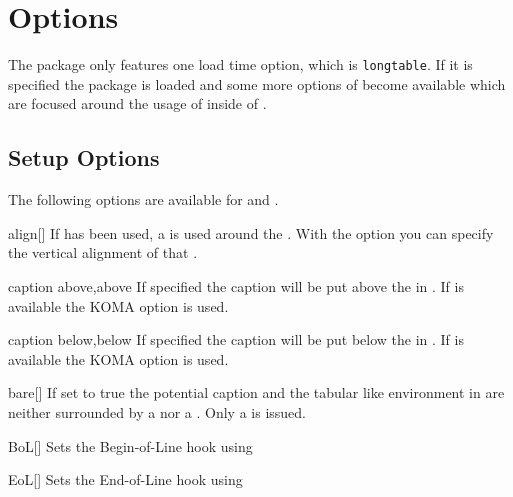 \section{Options}\label{sec:tab:options}%
The package only features one load time option, which is \texttt{longtable}. If
it is specified the  package is loaded and some more options of
 become available which are focused around the usage of
 inside of .

\subsection{Setup Options}\label{sec:tab:options:setup}
The following options are available for  and .

\begin{describeopt}{align}[]%
  If  has been used, a  is used around the
  . With the  option you can specify the vertical
  alignment of that .
\end{describeopt}%
\begin{describeopt}{caption above,above}%
  If specified the caption will be put above the  in
  . If  is available the KOMA option
   is used.
\end{describeopt}%
\begin{describeopt}{caption below,below}%
  If specified the caption will be put below the  in
  . If  is available the KOMA option
   is used.
\end{describeopt}%
\begin{describeopt}{bare}[]%
  If set to true the potential caption and the tabular like environment in
   are neither surrounded by a  nor a .
  Only a  is issued.
\end{describeopt}%
\begin{describeopt}{BoL}[]%
  Sets the  Begin-of-Line hook using 
\end{describeopt}%
\begin{describeopt}{EoL}[]%
  Sets the  End-of-Line hook using 
\end{describeopt}%
